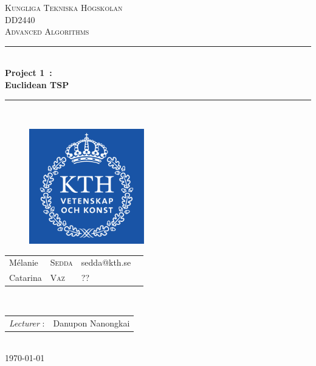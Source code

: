 \documentclass{article}
\begin{document}
\begin{titlepage}
\newcommand{\HRule}{\rule{\linewidth}{0.5mm}} %
\centering %
 
\null
\vspace{2cm}
\textsc{\Large Kungliga Tekniska Högskolan}\\[1cm] %
\textsc{\large DD2440 \\[0.3cm] Advanced Algorithms}\\[0.5cm] %

\vspace{0.5cm}
\HRule \\[0.4cm]
{ \LARGE \bfseries Project 1~: \\ [0.2cm]
\large Euclidean TSP} \\[0.4cm]

\HRule \\[0.5cm]
 
\vspace{1cm}
\begin{figure}[!h]
	\begin{center}
		\includegraphics[width=5cm]{images/kth.png}
	\end{center}
\end{figure}


\vspace{2cm}
\large 
{\begin{tabular}{llll}
 Mélanie & \textsc{Sedda} & sedda@kth.se\\
 Catarina & \textsc{Vaz} & ?? \\
\end{tabular}}
\\[1cm]

\normalsize
{\begin{tabular}{ll}
\textit{Lecturer} : & Danupon Nanongkai\\
\end{tabular}}
\\[1cm]


{\normalsize \today}\\[3cm] %

\newpage

\end{titlepage}
\end{document}
